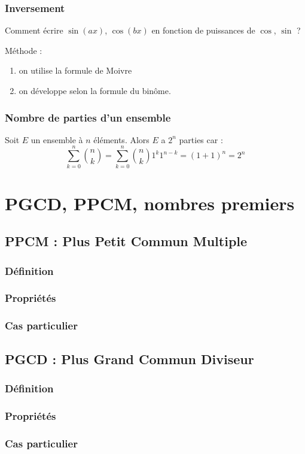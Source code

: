 \documentclass[12pt,a4paper,french]{book}
\begin{document}
		\subsection{Inversement}
			Comment écrire $\sin(ax)$, $\cos(bx)$ en fonction de puissances de $\cos$, $\sin$ ?
			
			Méthode : \begin{enumerate}
				\item on utilise la formule de Moivre
				\item on développe selon la formule du binôme.
			\end{enumerate}
		\subsection{Nombre de parties d'un ensemble}
			Soit $E$ un ensemble à $n$ éléments. Alors $E$ a $2^n$ parties car :
			\[\sum_{k = 0}^{n} \binom{n}{k} = \sum_{k = 0}^{n} \binom{n}{k} 1^{k} 1^{n-k} = (1+1)^{n} = 2^{n}\]
		
\chapter{PGCD, PPCM, nombres premiers}
	\section{PPCM : Plus Petit Commun Multiple}
		\subsection{Définition}
		\subsection{Propriétés}
		\subsection{Cas particulier}
	\section{PGCD : Plus Grand Commun Diviseur}
		\subsection{Définition}
		\subsection{Propriétés}
		\subsection{Cas particulier}
\end{document}
